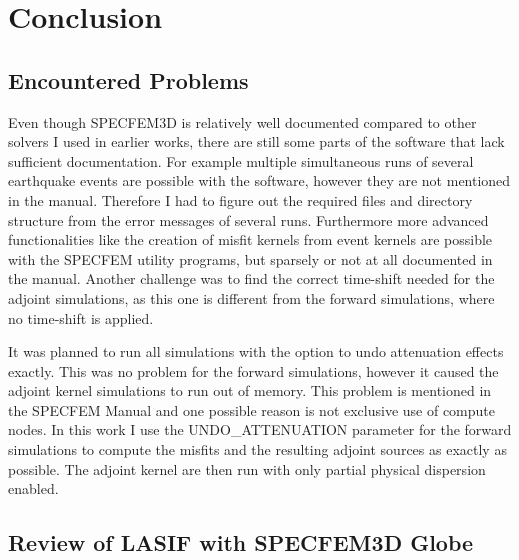 

\chapter{Conclusion}


\section{Encountered Problems}

Even though SPECFEM3D is relatively well documented compared to other solvers I used in 
earlier works, there are still some parts of the software that lack sufficient documentation.
For example multiple simultaneous runs of several earthquake events are possible with the 
software, however they are not mentioned in the manual.
Therefore I had to figure out the required files and directory structure from the error messages of
several runs. 
Furthermore more advanced functionalities like the creation of misfit kernels from event kernels are
possible with the SPECFEM utility programs, but sparsely or not at all documented in the manual.
Another challenge was to find the correct time-shift needed for the adjoint simulations, as this 
one is different from the forward simulations, where no time-shift is applied.

It was planned to run all simulations with the option to undo attenuation effects exactly. 
This was no problem for the forward simulations, however it caused the adjoint kernel
simulations to run out of memory.
This problem is mentioned in the SPECFEM Manual and one possible reason is not exclusive use
of compute nodes. 
In this work I use the UNDO\_ATTENUATION parameter for the forward simulations to compute the 
misfits and the resulting adjoint sources as exactly as possible.
The adjoint kernel are then run with only partial physical dispersion enabled.

\section{Review of LASIF with SPECFEM3D Globe} 

